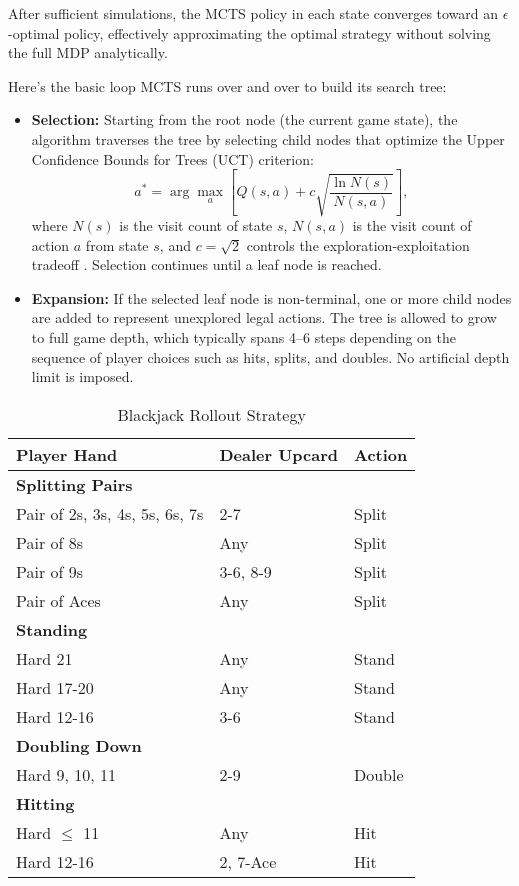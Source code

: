 \documentclass[12pt,a4paper]{cibb}
\begin{document}
After sufficient simulations, the MCTS policy in each state converges toward an $\epsilon$-optimal policy, effectively approximating the optimal strategy without solving the full MDP analytically.

Here’s the basic loop MCTS runs over and over to build its search tree:

\begin{itemize}
    \item \textbf{Selection:} Starting from the root node (the current game state), the algorithm traverses the tree by selecting child nodes that optimize the Upper Confidence Bounds for Trees (UCT) criterion:
    \[
    a^* = \arg\max_a \left[ Q(s, a) + c \sqrt{\frac{\ln N(s)}{N(s, a)}} \right],
    \]
    where $N(s)$ is the visit count of state $s$, $N(s, a)$ is the visit count of action $a$ from state $s$, and $c = \sqrt{2}$ controls the exploration-exploitation tradeoff \cite{kocsis2006bandit}. Selection continues until a leaf node is reached.

    \item \textbf{Expansion:} If the selected leaf node is non-terminal, one or more child nodes are added to represent unexplored legal actions. The tree is allowed to grow to full game depth, which typically spans 4–6 steps depending on the sequence of player choices such as hits, splits, and doubles. No artificial depth limit is imposed.
\end{itemize} 

\begin{table}[H]
    \centering
    \begin{tabular}{lll}
        \hline
        \textbf{Player Hand} & \textbf{Dealer Upcard} & \textbf{Action} \\
        \hline
        \multicolumn{3}{l}{\textbf{Splitting Pairs}} \\
        Pair of 2s, 3s, 4s, 5s, 6s, 7s & 2-7 & Split \\
        Pair of 8s & Any & Split \\
        Pair of 9s & 3-6, 8-9 & Split \\
        Pair of Aces & Any & Split \\
        \hline
        \multicolumn{3}{l}{\textbf{Standing}} \\
        Hard 21 & Any & Stand \\
        Hard 17-20 & Any & Stand \\
        Hard 12-16 & 3-6 & Stand \\
        \hline
        \multicolumn{3}{l}{\textbf{Doubling Down}} \\
        Hard 9, 10, 11 & 2-9 & Double \\
        \hline
        \multicolumn{3}{l}{\textbf{Hitting}} \\
        Hard $\leq$ 11 & Any & Hit \\ 
        Hard 12-16 & 2, 7-Ace & Hit \\
        \hline
    \end{tabular}
    \caption{Blackjack Rollout Strategy}
    \label{tab:blackjack_strategy} %
\end{table}
\end{document}
